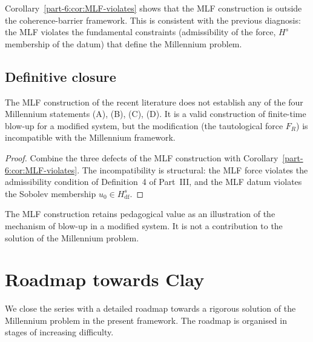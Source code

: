 \begin{remark}\label{part-6:rem:MLF-outside}
Corollary~\ref{part-6:cor:MLF-violates} shows that the MLF construction is 
outside the coherence-barrier framework. This is consistent with the 
previous diagnosis: the MLF violates the fundamental constraints 
(admissibility of the force, $H^s$ membership of the datum) that 
define the Millennium problem.
\end{remark}

\subsection{Definitive closure}
\label{part-6:ssec:MLF-closure-final}

\begin{theorem}\label{part-6:thm:MLF-closure}
The MLF construction of the recent literature does not establish any 
of the four Millennium statements (A), (B), (C), (D). It is a valid 
construction of finite-time blow-up for a modified system, but 
the modification (the tautological force $F_R$) is incompatible with 
the Millennium framework.
\end{theorem}

\begin{proof}
Combine the three defects of the MLF construction with 
Corollary~\ref{part-6:cor:MLF-violates}. The incompatibility is structural: 
the MLF force violates the admissibility condition of 
Definition~4 of Part~III, and the MLF datum violates the Sobolev 
membership $u_0\in H^s_{\mathrm{df}}$.
\end{proof}

\begin{remark}\label{part-6:rem:MLF-pedagogical-final}
The MLF construction retains pedagogical value as an illustration of 
the mechanism of blow-up in a modified system. It is not a 
contribution to the solution of the Millennium problem.
\end{remark}

\section{Roadmap towards Clay}
\label{part-6:sec:roadmap}

We close the series with a detailed roadmap towards a rigorous 
solution of the Millennium problem in the present framework. The 
roadmap is organised in stages of increasing difficulty.

